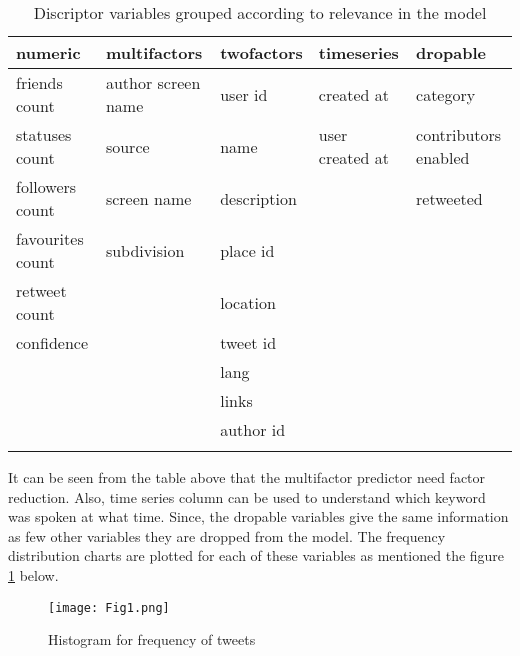 \documentclass[a4paper,12pt, notitlepage]{article}
\begin{document}
\begin{table}[!htbp]
\centering
\begin{tabular}{ |l|l|l|l|l| } 
\hline \rowcolor{Gray}
numeric	 & 	multifactors & twofactors & timeseries & dropable \\[1ex]
\hline
friends count    & author screen name & user id     & created at          & category \\[1ex]
statuses count   & source           & name      & user created at & contributors enabled\\[1ex]
followers count  & screen name        & description &             & retweeted \\[1ex]
favourites count & subdivision        & place id    &             &        \\[1ex]
retweet count    &                    & location    &             &        \\[1ex]
confidence       &                    & tweet id    &             &        \\[1ex]
                 &                    & lang        &             &        \\[1ex]
                 &                    & links       &             &        \\[1ex]
                 &                    & author id   &             &        \\[1ex]
                 &                    &             &             &        \\[1ex]
\hline
\end{tabular}
\caption{Discriptor variables grouped according to relevance in the model}
\label{table:3}
\end{table}

\par
It can be seen from the table above that the multifactor predictor need factor reduction. Also, time series column can be used to understand which keyword was spoken at what time. Since, the dropable variables give the same information as few other variables they are dropped from the model. The frequency distribution charts are plotted for each of these variables as mentioned the figure \ref{fig:hist1} below.

\begin{figure}[!htbp]
    \centering
    \texttt{[image: Fig1.png]}
    \caption{Histogram for frequency of tweets}
    \label{fig:hist1}
\end{figure}
\end{document}
